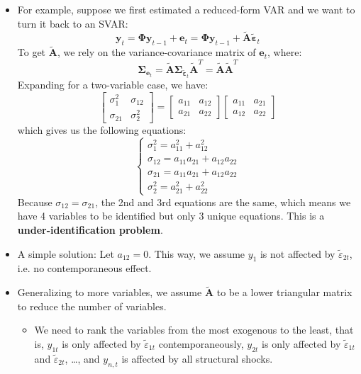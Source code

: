 \documentclass[notitlepage]{article}
\begin{document}
\begin{itemize}
    \item For example, suppose we first estimated a reduced-form VAR and we want to turn it back to an SVAR:
    \[
    \mathbf{y}_t = \boldsymbol{\Phi}\mathbf{y}_{t-1} + \mathbf{e}_t = \boldsymbol{\Phi}\mathbf{y}_{t-1} + \tilde{\mathbf{A}} \tilde{\boldsymbol{\varepsilon}}_t
    \]
    To get \(\tilde{\mathbf{A}}\), we rely on the variance-covariance matrix of \(\mathbf{e}_t\), where:
    \[
        \boldsymbol{\Sigma}_{\mathbf{e}_t} = \tilde{\mathbf{A}}\boldsymbol{\Sigma}_{\tilde{\boldsymbol{\varepsilon}}_t}\tilde{\mathbf{A}}^T = \tilde{\mathbf{A}}\tilde{\mathbf{A}}^T
    \]
    Expanding for a two-variable case, we have:
    \[
    \begin{bmatrix}
        \sigma_1^2 & \sigma_{12} \\ \sigma_{21} & \sigma_2^2
    \end{bmatrix} =
    \begin{bmatrix}
        a_{11} & a_{12} \\ a_{21} & a_{22}
    \end{bmatrix}
    \begin{bmatrix}
        a_{11} & a_{21} \\ a_{12} & a_{22}
    \end{bmatrix}
    \]
    which gives us the following equations:
    \[
    \begin{cases}
        \sigma_1^2 = a_{11}^2 + a_{12}^2 \\
        \sigma_{12} = a_{11}a_{21} + a_{12}a_{22} \\
        \sigma_{21} = a_{11}a_{21} + a_{12}a_{22} \\
        \sigma_2^2 = a_{21}^2 + a_{22}^2
    \end{cases}
    \]
    Because \(\sigma_{12}=\sigma_{21}\), the 2nd and 3rd equations are the same, which means we have 4 variables to be identified but only 3 unique equations. This is a \textbf{under-identification problem}.
    \item A simple solution: Let \(a_{12}=0\). This way, we assume \(y_1\) is not affected by \(\tilde\varepsilon_{2t}\), i.e. no contemporaneous effect.
    \item Generalizing to more variables, we assume \(\tilde{\mathbf{A}}\) to be a lower triangular matrix to reduce the number of variables. 
    \begin{itemize}
        \item We need to rank the variables from the most exogenous to the least, that is, \(y_{1t}\) is only affected by \(\tilde\varepsilon_{1t}\) contemporaneously, \(y_{2t}\) is only affected by \(\tilde\varepsilon_{1t}\) and \(\tilde\varepsilon_{2t}\), \dots, and \(y_{n,t}\) is affected by all structural shocks.

\end{itemize}
\end{itemize}
\end{document}
